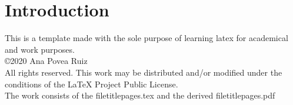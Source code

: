 \maketitle
\section{Introduction}
This is a template made with the sole purpose of learning latex for academical and work purposes.\\
©2020 Ana Povea Ruiz \\ 
All rights reserved. This work may be distributed and/or modified under the conditions of the LaTeX Project Public License.\\
The work consists of the filetitlepages.tex and the derived filetitlepages.pdf